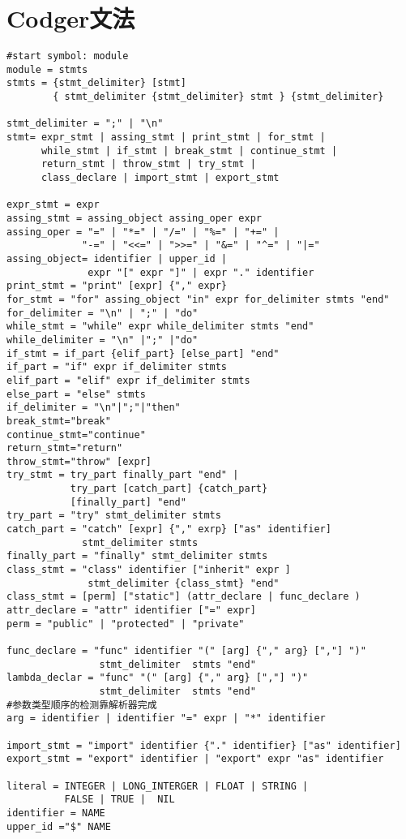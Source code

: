 \section{Codger文法}
\begin{verbatim}
#start symbol: module 
module = stmts
stmts = {stmt_delimiter} [stmt] 
        { stmt_delimiter {stmt_delimiter} stmt } {stmt_delimiter}
       
stmt_delimiter = ";" | "\n"
stmt= expr_stmt | assing_stmt | print_stmt | for_stmt |
      while_stmt | if_stmt | break_stmt | continue_stmt |
      return_stmt | throw_stmt | try_stmt | 
      class_declare | import_stmt | export_stmt 

expr_stmt = expr 
assing_stmt = assing_object assing_oper expr 
assing_oper = "=" | "*=" | "/=" | "%=" | "+=" |
             "-=" | "<<=" | ">>=" | "&=" | "^=" | "|="
assing_object= identifier | upper_id |
              expr "[" expr "]" | expr "." identifier 
print_stmt = "print" [expr] {"," expr}
for_stmt = "for" assing_object "in" expr for_delimiter stmts "end"
for_delimiter = "\n" | ";" | "do"
while_stmt = "while" expr while_delimiter stmts "end"
while_delimiter = "\n" |";" |"do"
if_stmt = if_part {elif_part} [else_part] "end"
if_part = "if" expr if_delimiter stmts 
elif_part = "elif" expr if_delimiter stmts
else_part = "else" stmts
if_delimiter = "\n"|";"|"then"
break_stmt="break"
continue_stmt="continue"
return_stmt="return"
throw_stmt="throw" [expr]
try_stmt = try_part finally_part "end" |
           try_part [catch_part] {catch_part}
           [finally_part] "end"
try_part = "try" stmt_delimiter stmts
catch_part = "catch" [expr] {"," exrp} ["as" identifier]
             stmt_delimiter stmts
finally_part = "finally" stmt_delimiter stmts
class_stmt = "class" identifier ["inherit" expr ] 
              stmt_delimiter {class_stmt} "end"
class_stmt = [perm] ["static"] (attr_declare | func_declare )
attr_declare = "attr" identifier ["=" expr]
perm = "public" | "protected" | "private" 

func_declare = "func" identifier "(" [arg] {"," arg} [","] ")"
                stmt_delimiter  stmts "end"
lambda_declar = "func" "(" [arg] {"," arg} [","] ")"
                stmt_delimiter  stmts "end"
#参数类型顺序的检测靠解析器完成
arg = identifier | identifier "=" expr | "*" identifier  

import_stmt = "import" identifier {"." identifier} ["as" identifier]
export_stmt = "export" identifier | "export" expr "as" identifier

literal = INTEGER | LONG_INTERGER | FLOAT | STRING | 
          FALSE | TRUE |  NIL 
identifier = NAME 
upper_id ="$" NAME 


\end{verbatim}
